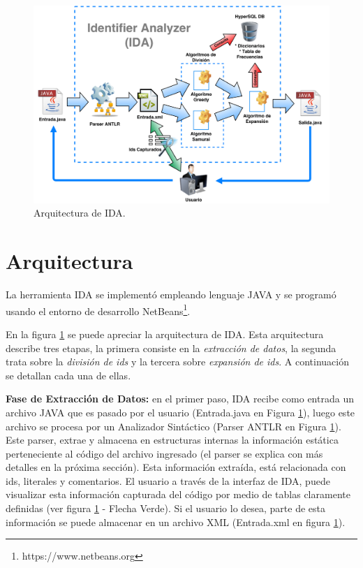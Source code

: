 \documentclass[a4paper,12pt]{report}
\begin{document}
\pagebreak
\begin{figure}[ht] %
\centerline{%
\includegraphics[scale= 0.35]{./ida_arq.png}
}
\caption{Arquitectura de IDA.}
\label{arq1}
\end{figure}

\vspace{-2em} %

\section{Arquitectura}

La herramienta IDA se implementó empleando lenguaje JAVA y se programó usando el entorno de desarrollo NetBeans\footnote[1]{https://www.netbeans.org}. 

En la figura \ref{arq1} se puede apreciar la arquitectura de IDA. Esta arquitectura describe tres etapas, la primera consiste en la \textit{extracción de datos}, la segunda trata sobre la \textit{división de ids} y la tercera sobre \textit{expansión de ids}. A continuación se detallan cada una de ellas.

\textbf{Fase de Extracción de Datos:} en el primer paso, IDA recibe como entrada un archivo JAVA que es pasado por el usuario (Entrada.java en Figura \ref{arq1}), luego este archivo se procesa por un Analizador Sintáctico (Parser ANTLR en Figura \ref{arq1}). Este parser, extrae y almacena en estructuras internas la información estática perteneciente al código del archivo ingresado (el parser se explica con más detalles en la próxima sección). Esta información extraída, está relacionada con ids, literales y comentarios. El usuario a través de la interfaz de IDA, puede visualizar esta información capturada del código por medio de tablas claramente definidas (ver figura \ref{arq1} - Flecha Verde). Si el usuario lo desea, parte de esta información se puede almacenar en un archivo XML (Entrada.xml en figura \ref{arq1}).
\end{document}
